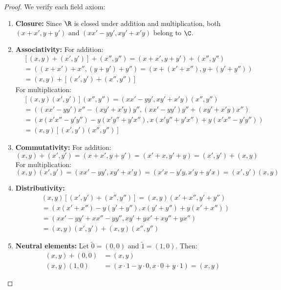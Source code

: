 \begin{proof}
    We verify each field axiom:
    \begin{enumerate}[label=(\roman*)]
        \item \textbf{Closure:} Since $\R$ is closed under addition and multiplication, both $(x+x', y+y')$ and $(xx'-yy', xy'+x'y)$ belong to $\C$.
        
        \item \textbf{Associativity:} For addition:
        \begin{align*}
            &[(x,y) + (x',y')] + (x'',y'') = (x+x', y+y') + (x'',y'') \\
            &= ((x+x')+x'', (y+y')+y'') = (x+(x'+x''), y+(y'+y'')) \\
            &= (x,y) + [(x',y') + (x'',y'')]
        \end{align*}
        For multiplication:
        \begin{align*}
            &[(x,y)(x',y')] (x'',y'') = (xx'-yy', xy'+x'y)(x'',y'') \\
            &= ((xx'-yy')x'' - (xy'+x'y)y'', (xx'-yy')y'' + (xy'+x'y)x'') \\
            &= (x(x'x'' - y'y'') - y(x'y'' + y'x''), x(x'y'' + y'x'') + y(x'x'' - y'y'')) \\
            &= (x,y)[(x',y')(x'',y'')]
        \end{align*}
        
        \item \textbf{Commutativity:} For addition:
        \[
            (x,y) + (x',y') = (x+x', y+y') = (x'+x, y'+y) = (x',y') + (x,y)
        \]
        For multiplication:
        \[
            (x,y)(x',y') = (xx'-yy', xy'+x'y) = (x'x - y'y, x'y + y'x) = (x',y')(x,y)
        \]
        \item \textbf{Distributivity:}
        \begin{align*}
            &(x,y)[(x',y') + (x'',y'')] = (x,y)(x'+x'', y'+y'') \\
            &= (x(x'+x'') - y(y'+y''), x(y'+y'') + y(x'+x'')) \\
            &= (xx' - yy' + xx'' - yy'', xy' + yx' + xy'' + yx'') \\
            &= (x,y)(x',y') + (x,y)(x'',y'')
        \end{align*}
        
        \item \textbf{Neutral elements:} Let $\tilde{0} = (0,0)$ and $\tilde{1} = (1,0)$. Then:
        \begin{align*}
            (x,y) + (0,0) &= (x,y) \\
            (x,y)(1,0) &= (x \cdot 1 - y \cdot 0, x \cdot 0 + y \cdot 1) = (x,y)
        \end{align*}
        

\end{enumerate}
\end{proof}
